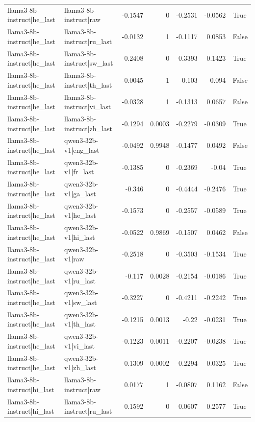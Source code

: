 \begin{table}
\begin{tabular}{l l r r r r l}
llama3-8b-instruct|he_last & llama3-8b-instruct|raw & -0.1547 & 0 & -0.2531 & -0.0562 & True \\
llama3-8b-instruct|he_last & llama3-8b-instruct|ru_last & -0.0132 & 1 & -0.1117 & 0.0853 & False \\
llama3-8b-instruct|he_last & llama3-8b-instruct|sw_last & -0.2408 & 0 & -0.3393 & -0.1423 & True \\
llama3-8b-instruct|he_last & llama3-8b-instruct|th_last & -0.0045 & 1 & -0.103 & 0.094 & False \\
llama3-8b-instruct|he_last & llama3-8b-instruct|vi_last & -0.0328 & 1 & -0.1313 & 0.0657 & False \\
llama3-8b-instruct|he_last & llama3-8b-instruct|zh_last & -0.1294 & 0.0003 & -0.2279 & -0.0309 & True \\
llama3-8b-instruct|he_last & qwen3-32b-v1|eng_last & -0.0492 & 0.9948 & -0.1477 & 0.0492 & False \\
llama3-8b-instruct|he_last & qwen3-32b-v1|fr_last & -0.1385 & 0 & -0.2369 & -0.04 & True \\
llama3-8b-instruct|he_last & qwen3-32b-v1|ga_last & -0.346 & 0 & -0.4444 & -0.2476 & True \\
llama3-8b-instruct|he_last & qwen3-32b-v1|he_last & -0.1573 & 0 & -0.2557 & -0.0589 & True \\
llama3-8b-instruct|he_last & qwen3-32b-v1|hi_last & -0.0522 & 0.9869 & -0.1507 & 0.0462 & False \\
llama3-8b-instruct|he_last & qwen3-32b-v1|raw & -0.2518 & 0 & -0.3503 & -0.1534 & True \\
llama3-8b-instruct|he_last & qwen3-32b-v1|ru_last & -0.117 & 0.0028 & -0.2154 & -0.0186 & True \\
llama3-8b-instruct|he_last & qwen3-32b-v1|sw_last & -0.3227 & 0 & -0.4211 & -0.2242 & True \\
llama3-8b-instruct|he_last & qwen3-32b-v1|th_last & -0.1215 & 0.0013 & -0.22 & -0.0231 & True \\
llama3-8b-instruct|he_last & qwen3-32b-v1|vi_last & -0.1223 & 0.0011 & -0.2207 & -0.0238 & True \\
llama3-8b-instruct|he_last & qwen3-32b-v1|zh_last & -0.1309 & 0.0002 & -0.2294 & -0.0325 & True \\
llama3-8b-instruct|hi_last & llama3-8b-instruct|raw & 0.0177 & 1 & -0.0807 & 0.1162 & False \\
llama3-8b-instruct|hi_last & llama3-8b-instruct|ru_last & 0.1592 & 0 & 0.0607 & 0.2577 & True \\

\end{tabular}
\end{table}
